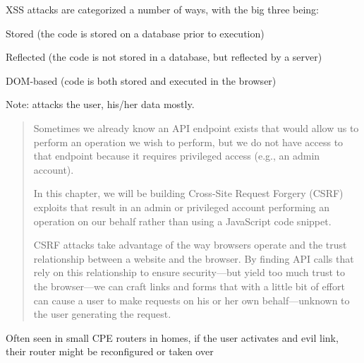 \documentclass[Screen16to9,17pt]{foils}
\begin{document}
XSS attacks are categorized a number of ways, with the big three being:
\begin{list2}
  \item Stored (the code is stored on a database prior to execution)
\item Reflected (the code is not stored in a database, but reflected by a server)
\item DOM-based (code is both stored and executed in the browser)
\end{list2}

Note: attacks the user, his/her data mostly.


\begin{quote}
Sometimes we already know an API endpoint exists that would allow us to perform an operation we wish to perform, but we do not have access to that endpoint because it requires privileged access (e.g., an admin account).

In this chapter, we will be building Cross-Site Request Forgery (CSRF) exploits that result in an admin or privileged account performing an operation on our behalf rather than using a JavaScript code snippet.

CSRF attacks take advantage of the way browsers operate and the trust relationship between a website and the browser. By finding API calls that rely on this relationship to ensure security—but yield too much trust to the browser—we can craft links and forms that with a little bit of effort can cause a user to make requests on his or her own behalf—unknown to the user generating the request.
\end{quote}

\begin{list2}
  \item Often seen in small CPE routers in homes, if the user activates and evil link, their router might be reconfigured or taken over
\end{list2}

\end{document}
